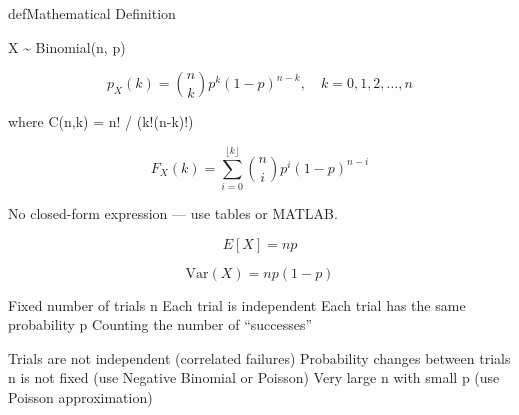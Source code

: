 \begin{PSbox}[unbreakable]{def}{Mathematical Definition}

X \textasciitilde{} Binomial(n, p)

\end{PSbox}


\[p_X(k) = \binom{n}{k} p^k (1-p)^{n-k}, \quad k = 0, 1, 2, \ldots, n\]

where C(n,k) = n! / (k!(n-k)!)


\[F_X(k) = \sum_{i=0}^{\lfloor k \rfloor} \binom{n}{i} p^i (1-p)^{n-i}\]

No closed-form expression — use tables or MATLAB.


\[E[X] = np\]


\[\text{Var}(X) = np(1-p)\]


\PSyes{} Fixed number of trials n\PSbr{}\PSyes{} Each trial is independent\PSbr{}\PSyes{} Each trial has the same probability p\PSbr{}\PSyes{} Counting the number of ``successes''


\PSno{} Trials are not independent (correlated failures)\PSbr{}\PSno{} Probability changes between trials\PSbr{}\PSno{} n is not fixed (use Negative Binomial or Poisson)\PSbr{}\PSno{} Very large n with small p (use Poisson approximation)



